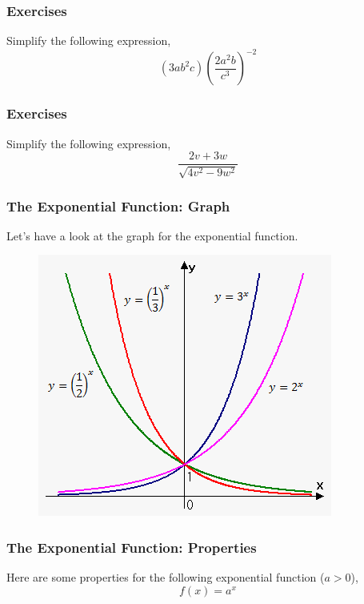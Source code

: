 \documentclass[xcolor=dvipsnames]{beamer}
\begin{document}
\begin{frame}
  \frametitle{Exercises}
{\ubung} Simplify the following expression,
\begin{equation}
  \label{eq:woongais}
(3ab^{2}c)\left(\frac{2a^{2}b}{c^{3}}\right)^{-2}
\end{equation}
\end{frame}

\begin{frame}
  \frametitle{Exercises}
{\ubung} Simplify the following expression,
\begin{equation}
  \label{eq:waitaeku}
\frac{2v+3w}{\sqrt{4v^{2}-9w^{2}}}
\end{equation}
\end{frame}

\begin{frame}
  \frametitle{The Exponential Function: Graph}
Let's have a look at the graph for the exponential function.
  \begin{figure}[h]
    \includegraphics[scale=.6]{./1_2_exponential_function.png}
  \end{figure}
\end{frame}

\begin{frame}
  \frametitle{The Exponential Function: Properties}
  Here are some properties for the following exponential function
  ($a>0$),
\begin{equation}
  \label{eq:muwauzie}
  f(x)=a^{x}
\end{equation}
\end{frame}
\end{document}
